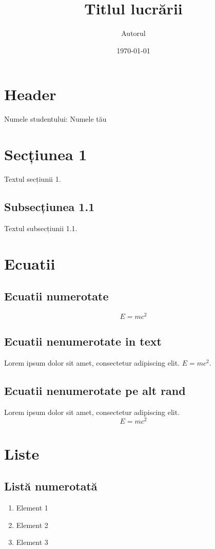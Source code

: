 \documentclass{article}
\title{Titlul lucrării}
\author{Autorul}
\date{\today}
\begin{document}
\maketitle

\section*{Header}
Numele studentului: Numele tău

\section{Secțiunea 1}
Textul secțiunii 1.

\subsection{Subsecțiunea 1.1}
Textul subsecțiunii 1.1.

\section{Ecuatii}
\subsection{Ecuatii numerotate}
\begin{equation}
    E = mc^2
\end{equation}

\subsection{Ecuatii nenumerotate in text}
Lorem ipsum dolor sit amet, consectetur adipiscing elit. $E = mc^2$.

\subsection{Ecuatii nenumerotate pe alt rand}
Lorem ipsum dolor sit amet, consectetur adipiscing elit.
\[
    E = mc^2
\]

\section{Liste}
\subsection{Listă numerotată}
\begin{enumerate}
    \item Element 1
    \item Element 2
    \item Element 3
\end{enumerate}
\end{document}
